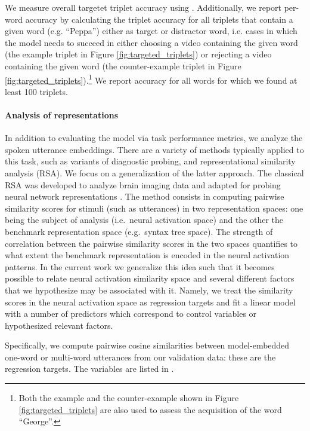 We measure overall targetet triplet accuracy using . Additionally, we report per-word accuracy by calculating the triplet accuracy for all triplets that contain a given word (e.g. ``Peppa'') either as target or distractor word, i.e. cases in which the model needs to succeed in either choosing a video containing the given word (the example triplet in Figure \ref{fig:targeted_triplets}) or rejecting a video containing the given word (the counter-example triplet in Figure \ref{fig:targeted_triplets}).\footnote{Both the example and the counter-example shown in Figure \ref{fig:targeted_triplets} are also used to assess the acquisition of the word ``George''.}
We report accuracy for all words for which we found at least 100 triplets.

\paragraph{Analysis of representations}
In addition to evaluating the model via task performance metrics, we
analyze the spoken utterance embeddings. There are a variety of
methods typically applied to this task, such as variants of diagnostic
probing, and representational similarity analysis (RSA). We focus on
a generalization of the latter approach.
The classical RSA was developed to analyze brain imaging data
\citep{kriegeskorte2008representational} and adapted for probing
neural network representations
\citep[e.g.][]{chrupala-alishahi-2019-correlating}. The method
consists in computing pairwise similarity scores for stimuli (such as
utterances) in two representation spaces: one being the subject of
analysis (i.e.\ neural activation space) and the other the benchmark
representation space (e.g.\ syntax tree space). The strength of
correlation between the pairwise similarity scores in the two spaces
quantifies to what extent the benchmark representation is encoded in
the neural activation patterns. In the current work we generalize this
idea such that it becomes possible to relate
neural activation similarity space and several different factors that
we hypothesize may be associated with it. Namely, we treat the
similarity scores in the neural activation space as regression targets
and fit a linear model with a number of predictors which 
correspond to control variables or hypothesized relevant factors.

Specifically, we compute pairwise cosine similarities between
model-embedded one-word or multi-word utterances from our validation data: these are
the regression targets. The variables are listed in .

